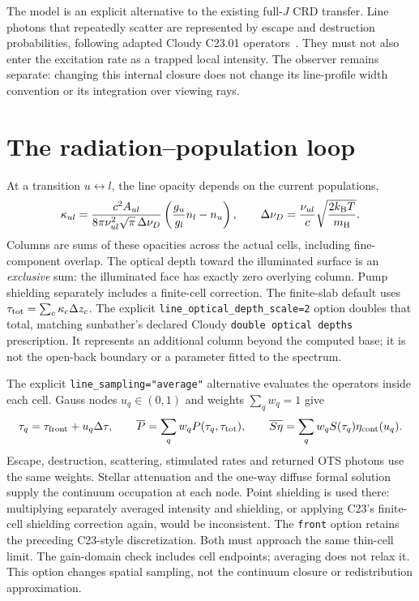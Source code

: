 \documentclass[10pt,a4paper]{article}
\begin{document}
The model is an explicit alternative to the existing full-$J$ CRD transfer.
Line photons that repeatedly scatter are represented by escape and destruction
probabilities, following adapted Cloudy C23.01 operators~\cite{cloudy}.
They must not also enter the excitation rate as a trapped local intensity.
The observer remains separate: changing this internal closure does not change
its line-profile width convention or its integration over viewing rays.

\section{The radiation--population loop}
At a transition $u\leftrightarrow l$, the line opacity depends on the current
populations,
\begin{equation}
 \kappa_{ul}=\frac{c^2A_{ul}}{8\pi\nu_{ul}^2\sqrt\pi\,\Delta\nu_D}
 \left(\frac{g_u}{g_l}n_l-n_u\right),\qquad
 \Delta\nu_D=\frac{\nu_{ul}}c\sqrt{\frac{2k_{\rm B}T}{m_{\rm H}}}.
 \label{eq:opacity}
\end{equation}
Columns are sums of these opacities across the actual cells, including
fine-component overlap. The optical depth toward the illuminated surface is
an \emph{exclusive} sum: the illuminated face has exactly zero overlying
column. Pump shielding separately includes a finite-cell correction.
The finite-slab default uses $\tau_{\rm tot}=\sum_c\kappa_c\Delta z_c$.
The explicit \texttt{line\_optical\_depth\_scale=2} option doubles that total,
matching sunbather's declared Cloudy \texttt{double optical depths} prescription.
It represents an additional column beyond the computed base; it is not the
open-back boundary or a parameter fitted to the spectrum.

The explicit \texttt{line\_sampling="average"} alternative evaluates the
operators inside each cell. Gauss nodes $u_q\in(0,1)$ and weights
$\sum_qw_q=1$ give
\begin{equation}
 \tau_q=\tau_{\rm front}+u_q\Delta\tau,\qquad
 \overline P=\sum_q w_q P(\tau_q,\tau_{\rm tot}),\qquad
 \overline{S\eta}=\sum_qw_q S(\tau_q)\eta_{\rm cont}(u_q).
 \label{eq:cell_average}
\end{equation}
Escape, destruction, scattering, stimulated rates and returned OTS photons
use the same weights. Stellar attenuation and the one-way diffuse formal
solution supply the continuum occupation at each node. Point shielding is
used there: multiplying separately averaged intensity and shielding, or
applying C23's finite-cell shielding correction again, would be inconsistent.
The \texttt{front} option retains the preceding C23-style discretization.
Both must approach the same thin-cell limit. The gain-domain check includes
cell endpoints; averaging does not relax it. This option changes spatial
sampling, not the continuum closure or redistribution approximation.
\end{document}
